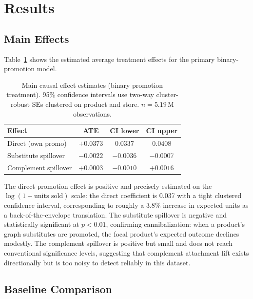 \documentclass[conference]{IEEEtran}
\begin{document}
\section{Results}

\subsection{Main Effects}

Table~\ref{tab:main} shows the estimated average treatment effects for the
primary binary-promotion model.

\begin{table}[ht]
    \centering
    \caption{Main causal effect estimates (binary promotion treatment).
        95\% confidence intervals use two-way cluster-robust SEs clustered
        on product and store. $n = 5.19\,\mathrm{M}$ observations.}
    \label{tab:main}
    \begin{tabular}{lccc}
        \toprule
        Effect               & ATE       & CI lower  & CI upper  \\
        \midrule
        Direct (own promo)   & $+0.0373$ & $0.0337$  & $0.0408$  \\
        Substitute spillover & $-0.0022$ & $-0.0036$ & $-0.0007$ \\
        Complement spillover & $+0.0003$ & $-0.0010$ & $+0.0016$ \\
        \bottomrule
    \end{tabular}
\end{table}

The direct promotion effect is positive and precisely estimated on the
$\log(1 + \text{units sold})$ scale: the direct coefficient is 0.037 with a
tight clustered confidence interval, corresponding to roughly a 3.8\%
increase in expected units as a back-of-the-envelope translation.
The substitute spillover is negative and statistically significant at
$p < 0.01$, confirming cannibalization: when a product's graph substitutes
are promoted, the focal product's expected outcome declines modestly.
The complement spillover is positive but small and does not reach
conventional significance levels, suggesting that complement attachment lift
exists directionally but is too noisy to detect reliably in this dataset.

\subsection{Baseline Comparison}
\end{document}
